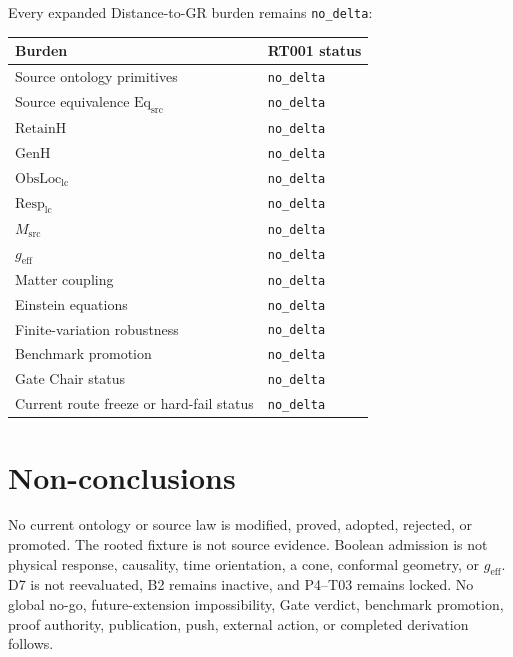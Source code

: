 \documentclass[11pt]{article}
\newcommand{\EqSrc}{\mathrm{Eq}_{\mathrm{src}}}
\newcommand{\NoDelta}{\texttt{no\_delta}}
\begin{document}
Every expanded Distance-to-GR burden remains \NoDelta{}:
\begin{center}
\small
\begin{tabular}{ll}
\toprule
Burden & RT001 status \\
\midrule
Source ontology primitives & \NoDelta{} \\
Source equivalence $\EqSrc$ & \NoDelta{} \\
$\mathrm{RetainH}$ & \NoDelta{} \\
$\mathrm{GenH}$ & \NoDelta{} \\
$\mathrm{ObsLoc}_{\mathrm{lc}}$ & \NoDelta{} \\
$\mathrm{Resp}_{\mathrm{lc}}$ & \NoDelta{} \\
$M_{\mathrm{src}}$ & \NoDelta{} \\
$g_{\mathrm{eff}}$ & \NoDelta{} \\
Matter coupling & \NoDelta{} \\
Einstein equations & \NoDelta{} \\
Finite-variation robustness & \NoDelta{} \\
Benchmark promotion & \NoDelta{} \\
Gate Chair status & \NoDelta{} \\
Current route freeze or hard-fail status & \NoDelta{} \\
\bottomrule
\end{tabular}
\end{center}

\section{Non-conclusions}

No current ontology or source law is modified, proved, adopted, rejected, or
promoted.  The rooted fixture is not source evidence.  Boolean admission is
not physical response, causality, time orientation, a cone, conformal geometry,
or $g_{\mathrm{eff}}$.  D7 is not reevaluated, B2 remains inactive, and P4--T03
remains locked.  No global no-go, future-extension impossibility, Gate verdict,
benchmark promotion, proof authority, publication, push, external action, or
completed derivation follows.
\end{document}
